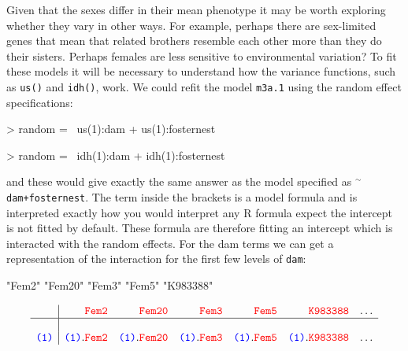 \documentclass{article}
\begin{document}
Given that the sexes differ in their mean phenotype it may be worth exploring whether they vary in other ways. For example, perhaps there are sex-limited genes that mean that related brothers resemble each other more than they do their sisters. Perhaps females are less sensitive to environmental variation? To fit these models it will be necessary to understand how the variance functions, such as \texttt{us()} and \texttt{idh()}, work.  We could refit the model \texttt{m3a.1} using the random effect specifications:

\begin{Schunk}
\begin{Sinput}
> random = ~us(1):dam + us(1):fosternest
\end{Sinput}
\end{Schunk}

\begin{Schunk}
\begin{Sinput}
> random = ~idh(1):dam + idh(1):fosternest
\end{Sinput}
\end{Schunk}

and these would give exactly the same answer as the model specified as $^{\sim}$\texttt{dam+fosternest}. The term inside the brackets is a model formula and is interpreted exactly how you would interpret any R formula expect the intercept is not fitted by default. These formula are therefore fitting an intercept which is interacted with the random effects. For the dam terms we can get a representation of the interaction for the first few levels of \texttt{dam}:

\begin{Schunk}
\begin{Soutput}
[1] "Fem2"    "Fem20"   "Fem3"    "Fem5"    "K983388"
\end{Soutput}
\end{Schunk}


\begin{displaymath}
\begin{array}{c|rrrrrc}
&{\color{red} \texttt{Fem2}}&{\color{red} \texttt{Fem20}}&{\color{red} \texttt{Fem3}}&{\color{red} \texttt{Fem5}}&{\color{red} \texttt{K983388}}&\dots\\
\hline\\
{\color{blue} \texttt{(1)}}&{\color{blue} \texttt{(1)}}.{\color{red} \texttt{Fem2}}&{\color{blue} \texttt{(1)}}.{\color{red} \texttt{Fem20}}&{\color{blue} \texttt{(1)}}.{\color{red} \texttt{Fem3}}&{\color{blue} \texttt{(1)}}.{\color{red} \texttt{Fem5}}&{\color{blue} \texttt{(1)}}.{\color{red} \texttt{K983388}}&\dots\\
\end{array}
\end{displaymath}
  
\end{document}
